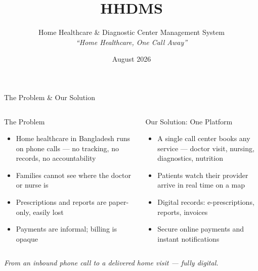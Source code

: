 \documentclass[aspectratio=169,11pt]{beamer}
\title[HHDMS -- Home Healthcare Platform]{HHDMS}
\subtitle{Home Healthcare \& Diagnostic Center Management System\\
{\normalsize\itshape ``Home Healthcare, One Call Away''}}
\author[CSE 299 $\cdot$ NSU]{CSE 299 --- North South University\\[2pt]
{\small Team:\; Name 1 \and Name 2 \and Name 3 \and Name 4}}
\date{August 2026}
\begin{document}
\begin{frame}[plain]
  \titlepage
\end{frame}

\begin{frame}{The Problem \& Our Solution}
  \begin{columns}[T]
    \begin{block}{The Problem}
      \begin{itemize}
        \item Home healthcare in Bangladesh runs on phone calls --- no tracking, no records, no accountability
        \item Families cannot see where the doctor or nurse is
        \item Prescriptions and reports are paper-only, easily lost
        \item Payments are informal; billing is opaque
      \end{itemize}
    \end{block}
    \begin{block}{Our Solution: One Platform}
      \begin{itemize}
        \item A single call center books any service --- doctor visit, nursing, diagnostics, nutrition
        \item Patients watch their provider arrive in real time on a map
        \item Digital records: e-prescriptions, reports, invoices
        \item Secure online payments and instant notifications
      \end{itemize}
    \end{block}
  \end{columns}
  \vfill
  \centering
  {\footnotesize\itshape\color{TealDark} From an inbound phone call to a delivered home visit --- fully digital.}
\end{frame}
\end{document}
